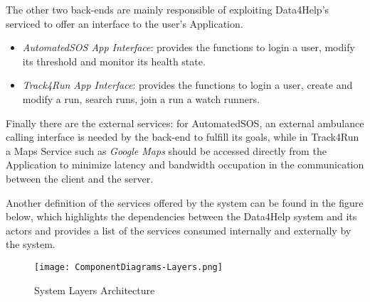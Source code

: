 The other two back-ends are mainly responsible of exploiting Data4Help's serviced to offer an interface to the user's Application. 

\begin{itemize}
	\item \textit{AutomatedSOS App Interface}: provides the functions to login a user, modify its threshold and monitor its health state.
	\item \textit{Track4Run App Interface}: provides the functions to login a user, create and modify a run, search runs, join a run a watch runners.
\end{itemize}

Finally there are the external services: for AutomatedSOS, an external ambulance calling interface is needed by the back-end to fulfill its goals, while in Track4Run a Maps Service such as \textit{Google Maps} should be accessed directly from the Application to minimize latency and bandwidth occupation in the communication between the client and the server.

Another definition of the services offered by the system can be found in the figure below, which highlights the dependencies between the Data4Help system and its actors and provides a list of the services consumed internally and externally by the system.

\FloatBarrier
\begin{figure}[!h]
	\centering
	\texttt{[image: ComponentDiagrams-Layers.png]}
	\caption{System Layers Architecture}
\end{figure}
\FloatBarrier

